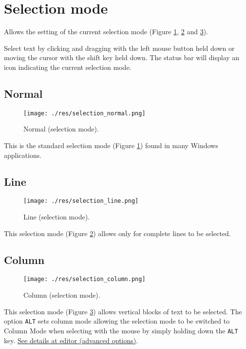 
\hypertarget{working_selectionmode}{}
\section{Selection mode}

Allows the setting of the current selection mode
(Figure \ref{fig:selection_normal},
\ref{fig:selection_line} and
\ref{fig:selection_column}).

Select text by clicking and dragging with the left mouse button held
down or moving the cursor with the shift key held down. The status
bar will display an icon indicating the current selection mode.

\hypertarget{working_selectionmode_normal}{}
\subsection{Normal}

\begin{figure}[H]
  \texttt{[image: ./res/selection\_normal.png]}\\
  \caption{Normal (selection mode).}
  \label{fig:selection_normal}
\end{figure}

This is the standard selection mode
(Figure \ref{fig:selection_normal})
found in many Windows applications.

\hypertarget{working_selectionmode_line}{}
\subsection{Line}

\begin{figure}[H]
  \texttt{[image: ./res/selection\_line.png]}\\
  \caption{Line (selection mode).}
  \label{fig:selection_line}
\end{figure}

This selection mode
(Figure \ref{fig:selection_line})
allows only for complete lines to be selected.

\hypertarget{working_selectionmode_column}{}
\subsection{Column}

\begin{figure}[H]
  \texttt{[image: ./res/selection\_column.png]}\\
  \caption{Column (selection mode).}
  \label{fig:selection_column}
\end{figure}

This selection mode
(Figure \ref{fig:selection_column})
allows vertical blocks of text to be selected.
The option \texttt{ALT} sets column mode allowing the selection
mode to be switched to Column Mode when selecting with the mouse
by simply holding down the \texttt{ALT} key.
\href{\#working_editor_advanced}{See details at editor (advanced options)}.
